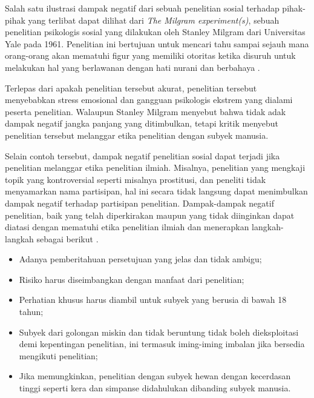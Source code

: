 	\question
\lipsum[4]
\begin{solution}
	Salah satu ilustrasi dampak negatif dari sebuah penelitian sosial terhadap pihak-pihak yang terlibat dapat dilihat dari \textit{The Milgram experiment(s)}, sebuah penelitian psikologis sosial yang dilakukan oleh Stanley Milgram dari Universitas Yale pada 1961.
	Penelitian ini bertujuan untuk mencari tahu sampai sejauh mana orang-orang akan mematuhi figur yang memiliki otoritas ketika disuruh untuk melakukan hal yang berlawanan dengan hati nurani dan berbahaya \cite{milgram_behavioral_1963}.
	
	Terlepas dari apakah penelitian tersebut akurat, penelitian tersebut menyebabkan stress emosional dan gangguan psikologis ekstrem yang dialami peserta penelitian.
	Walaupun Stanley Milgram menyebut bahwa tidak adak dampak negatif jangka panjang yang ditimbulkan, tetapi kritik menyebut penelitian tersebut melanggar etika penelitian dengan subyek manusia.
	
	Selain contoh tersebut, dampak negatif penelitian sosial dapat terjadi jika penelitian melanggar etika penelitian ilmiah.
	Misalnya, penelitian yang mengkaji topik yang kontroversial seperti misalnya prostitusi, dan peneliti tidak menyamarkan nama partisipan, hal ini secara tidak langsung dapat menimbulkan dampak negatif terhadap partisipan penelitian.
	Dampak-dampak negatif penelitian, baik yang telah diperkirakan maupun yang tidak diinginkan dapat diatasi dengan mematuhi etika penelitian ilmiah dan menerapkan langkah-langkah sebagai berikut \cite{sass_reichsrundschreiben_1983}.
	\begin{itemize}
		\item Adanya pemberitahuan persetujuan yang jelas dan tidak ambigu;
		\item Risiko harus diseimbangkan dengan manfaat dari penelitian;
		\item Perhatian khusus harus diambil untuk subyek yang berusia di bawah 18 tahun;
		\item Subyek dari golongan miskin dan tidak beruntung tidak boleh dieksploitasi demi kepentingan penelitian, ini termasuk iming-iming imbalan jika bersedia mengikuti penelitian;
		\item Jika memungkinkan, penelitian dengan subyek hewan dengan kecerdasan tinggi seperti kera dan simpanse didahulukan dibanding subyek manusia.
	\end{itemize}
\end{solution}

